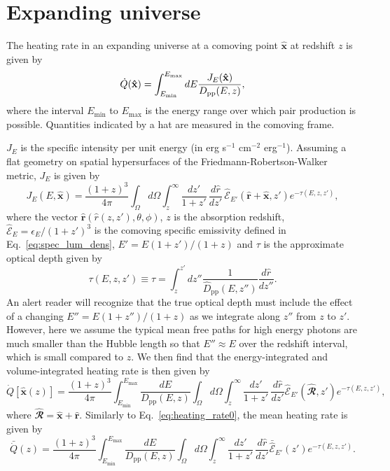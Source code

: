 \documentclass[numberedappendix]{emulateapj}
\newcommand{\calR}{\ensuremath{\bm\hat{\mathbfcal{R}}}}
\begin{document}
\section{Expanding universe}\label{sec:window_exp}

The heating rate in an expanding universe at a comoving point $\mathbf{\hat{x}}$ at redshift $z$ is given by
\begin{equation}
  \dot{Q}(\mathbf{\hat{x}})= \int_{E_{\rm min}}^{E_{\rm max}} dE \frac{J_E(\mathbf{\hat{x}})}{D_{\mathrm{pp}}(E, z)},
\end{equation}
where the interval $E_{\mathrm{min}}$ to $E_{\mathrm{max}}$ is the energy range over which pair
production is possible. Quantities indicated by a hat are measured in the
comoving frame.

$J_E$ is the specific intensity per unit energy (in erg s$^{-1}$ cm$^{-2}$ erg$^{-1}$). Assuming a flat geometry on spatial hypersurfaces of the Friedmann-Robertson-Walker metric, $J_E$ is given by
\begin{equation}\label{eq:expanding J}
  J_E(E, \mathbf{\hat{x}}) = \frac {(1 + z)^3} {4\pi} \int_{\Omega} d\Omega \int_z^{\infty} \frac{d z'}{1+z'}\,\frac{d\hat{r}}{dz'}\, {\hat{\mathcal{E}}_{E'}(\mathbf{\hat{r}}+\mathbf{\hat{x}}, z')}e^{-\tau(E,z,z')},
\end{equation}
where the vector $\mathbf{\hat{r}}(\hat{r}(z,z'), \theta, \phi)$, $z$ is the absorption redshift, $\hat{\mathcal{E}}_E = \epsilon_E/(1+z')^3$ is the comoving specific emissivity defined in Eq.~\eqref{eq:spec_lum_dens}, $E' = E (1+z')/(1+z)$ and $\tau$ is the approximate optical depth given by
\begin{equation}
\label{eq:tau}
\tau(E,z,z')\equiv \tau=\int_z^{z'}dz''\frac{1}{\hat D_{\mathrm{pp}}(E,z'')}\frac{d\hat r}{dz''}.
\end{equation}
An alert reader will recognize that the true optical depth must include the effect of a changing $E'' = E(1+z'')/(1+z)$ as we integrate along $z''$ from $z$ to $z'$.  However, here we assume the typical mean free paths for high energy photons are much smaller than the Hubble length so that $E'' \approx E$ over the redshift interval, which  is small compared to $z$.  
We then find that the energy-integrated and volume-integrated heating rate is then given by 
\begin{equation}
  \label{eq:int_exp_heat}
  \dot{Q}[\mathbf{\hat{x}}(z)]=\frac{(1+z)^3}{4\pi }\int_{E_{\mathrm{min}}}^{E_{\mathrm{max}}} \frac{dE}{D_{\mathrm{pp}}(E,z)}\int_{\Omega}d\Omega\int_z^{\infty} \frac{d z'}{1+z'}\,\frac{d\hat r}{dz'}
\mathcal{\hat E}_{E'}(\calR, z') e^{-\tau(E,z,z')},
\end{equation}
where $\calR = \mathbf{\hat{x}} + \mathbf{\hat{r}}$. Similarly to Eq.~\eqref{eq:heating_rate0}, the mean heating rate is given by
\begin{equation}
\label{eq:mean_exp_heat}
\bar{\dot{Q}} (z)=\frac{(1+z)^3}{4\pi}\int_{E_{\mathrm{min}}}^{E_{\mathrm{max}}} \frac{dE}{D_{\mathrm{pp}}(E, z)}\int_{\Omega}d\Omega\int_z^{\infty} \frac{d z'}{1+z'}\, \frac{d\hat r}{dz'}\bar{\hat{\mathcal{E}}}_{E'}(z') e^{-\tau(E,z,z')}.
\end{equation}
\end{document}
